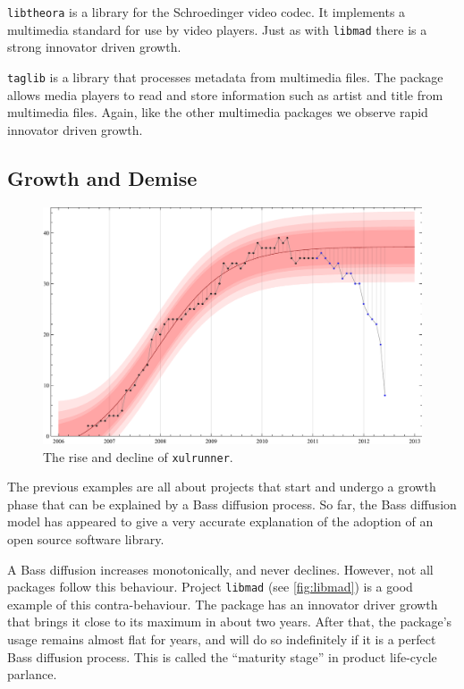 \documentclass[smallextended,final]{svjour3}
\begin{document}
\verb|libtheora| is a library for the Schroedinger video codec. It implements a multimedia standard for use by video players. Just as with \verb|libmad| there is a strong innovator driven growth.

\verb|taglib| is a library that processes metadata from multimedia files. The package allows media players to read and store information such as artist and title from multimedia files. Again, like the other multimedia packages we observe rapid innovator driven growth.

\subsection{Growth and Demise}

\begin{figure}
\centering
\includegraphics[width=\linewidth]{BassFit-xulrunner-22.pdf}
\vspace{-2em}
\caption{The rise and decline of \texttt{xulrunner}.}\label{fig:xulrunner}
\vspace{-1em}
\end{figure}

The previous examples are all about projects that start and undergo a growth phase that can be explained by a Bass diffusion process. So far, the Bass diffusion model has appeared to give a very accurate explanation of the adoption of an open source software library.

A Bass diffusion increases monotonically, and never declines. However, not all packages follow this behaviour. Project \verb|libmad| (see \ref{fig:libmad}) is a good example of this contra-behaviour. The package has an innovator driver growth that brings it close to its maximum in about two years. After that, the package's usage remains almost flat for years, and will do so indefinitely if it is a perfect Bass diffusion process. This is called the ``maturity stage'' in product life-cycle parlance.
\end{document}
